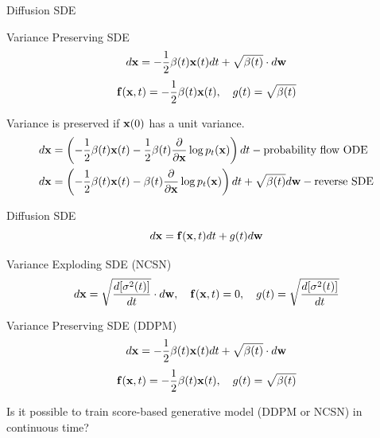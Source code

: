 \begin{frame}{Diffusion SDE}
	\begin{block}{Variance Preserving SDE}
		\vspace{-0.3cm}
		\[
			d \mathbf{x} = - \frac{1}{2} \beta(t) \mathbf{x}(t) dt + \sqrt{\beta(t)} \cdot d \mathbf{w}
		\]
		\[
			\mathbf{f}(\mathbf{x}, t) = - \frac{1}{2} \beta(t) \mathbf{x}(t) , \quad g(t) = \sqrt{\beta(t)} 
		\]
	\end{block}
	Variance is preserved if $\mathbf{x}(0)$ has a unit variance.
	\begin{align*}
		d\mathbf{x} &= \left(- \frac{1}{2} \beta(t) \mathbf{x}(t) - \frac{1}{2} \beta(t) \frac{\partial}{\partial \mathbf{x}} \log p_t(\mathbf{x}) \right) dt - \text{probability flow ODE} \\
		d\mathbf{x} &= \left(- \frac{1}{2} \beta(t) \mathbf{x}(t) - \beta(t) \frac{\partial}{\partial \mathbf{x}} \log p_t(\mathbf{x})\right) dt + \sqrt{\beta(t)} d \mathbf{w} - \text{reverse SDE}
	\end{align*}
\end{frame}
\begin{frame}{Diffusion SDE}
	\vspace{-0.5cm}
	\[
		d\mathbf{x} = \mathbf{f}(\mathbf{x}, t) dt + g(t) d \mathbf{w}
	\]
	\vspace{-0.3cm}
	\begin{block}{Variance Exploding SDE (NCSN)}
		\vspace{-0.5cm}
		\[
			d \mathbf{x} = \sqrt{\frac{ d [\sigma^2(t)]}{dt}} \cdot d \mathbf{w}, \quad \mathbf{f}(\mathbf{x}, t) = 0, \quad g(t) = \sqrt{\frac{ d [\sigma^2(t)]}{dt}} 
		\]
		\vspace{-0.5cm}
	\end{block}
	\begin{block}{Variance Preserving SDE (DDPM)}
		\vspace{-0.3cm}
		\[
			d \mathbf{x} = - \frac{1}{2} \beta(t) \mathbf{x}(t) dt + \sqrt{\beta(t)} \cdot d \mathbf{w}
		\]
		\[
			\mathbf{f}(\mathbf{x}, t) = - \frac{1}{2} \beta(t) \mathbf{x}(t) , \quad g(t) = \sqrt{\beta(t)} 
		\]
		\vspace{-0.3cm}
	\end{block}
	Is it possible to train score-based generative model (DDPM or NCSN) in continuous time?
\end{frame}
